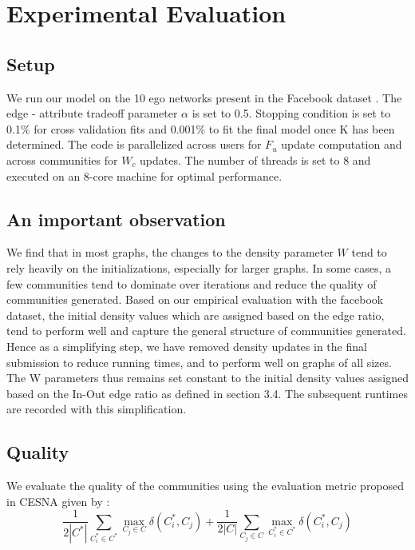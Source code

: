 \documentclass[11pt]{article}
\begin{document}
\section{Experimental Evaluation}
\subsection{Setup}
We run our model on the 10 ego networks present in the Facebook dataset \cite{facebook dataset}. The edge - attribute tradeoff parameter $\alpha$ is set to 0.5. Stopping condition is set to 0.1\% for cross validation fits and 0.001\% to fit the final model once K has been determined.  The code is parallelized across users for $F_{u}$ update computation and across communities for $W_{c}$ updates. The number of threads is set to 8 and executed on an 8-core machine for optimal performance.
\subsection{An important observation}
We find that in most graphs, the changes to the density parameter $W$ tend to rely heavily on the initializations, especially for larger graphs. In some cases, a few communities tend to dominate over iterations and reduce the quality of communities generated. Based on our empirical evaluation with the facebook dataset, the initial density values which are assigned based on the edge ratio, tend to perform well and capture the general structure of communities generated. Hence as a simplifying step, we have removed density updates in the final submission to reduce running times, and to perform well on graphs of all sizes. The W parameters thus remains set constant to the initial density values assigned based on the In-Out edge ratio as defined in section 3.4. The subsequent runtimes are recorded with this simplification.
\subsection{Quality}
We evaluate the quality of the communities using the evaluation metric proposed in CESNA given by : 
\[ \frac{1}{2 |C^{*}|} \sum\limits_{C_i^{*} \in C^{*}} \max_{C_j \in C} \delta (C_i^{*}, C_j) + \frac{1}{2 |C|} \sum\limits_{C_j \in C} \max_{C_i^{*} \in C^{*}} \delta (C_i^{*}, C_j) \]
\end{document}
